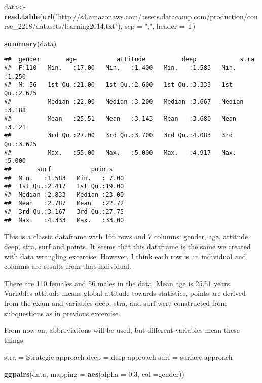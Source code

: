 \documentclass[
]{article}
\newenvironment{Shaded}{\begin{snugshade}}{\end{snugshade}}
\newcommand{\DataTypeTok}[1]{\textcolor[rgb]{0.13,0.29,0.53}{#1}}
\newcommand{\FloatTok}[1]{\textcolor[rgb]{0.00,0.00,0.81}{#1}}
\newcommand{\KeywordTok}[1]{\textcolor[rgb]{0.13,0.29,0.53}{\textbf{#1}}}
\newcommand{\NormalTok}[1]{#1}
\newcommand{\StringTok}[1]{\textcolor[rgb]{0.31,0.60,0.02}{#1}}
\begin{document}
\begin{Shaded}
\begin{Highlighting}[]
\NormalTok{data<-}\StringTok{ }\KeywordTok{read.table}\NormalTok{(}\KeywordTok{url}\NormalTok{(}\StringTok{"http://s3.amazonaws.com/assets.datacamp.com/production/course_2218/datasets/learning2014.txt"}\NormalTok{), }
                  \DataTypeTok{sep =} \StringTok{","}\NormalTok{, }\DataTypeTok{header =}\NormalTok{ T)}

\KeywordTok{summary}\NormalTok{(data)}
\end{Highlighting}
\end{Shaded}

\begin{verbatim}
##  gender       age           attitude          deep            stra      
##  F:110   Min.   :17.00   Min.   :1.400   Min.   :1.583   Min.   :1.250  
##  M: 56   1st Qu.:21.00   1st Qu.:2.600   1st Qu.:3.333   1st Qu.:2.625  
##          Median :22.00   Median :3.200   Median :3.667   Median :3.188  
##          Mean   :25.51   Mean   :3.143   Mean   :3.680   Mean   :3.121  
##          3rd Qu.:27.00   3rd Qu.:3.700   3rd Qu.:4.083   3rd Qu.:3.625  
##          Max.   :55.00   Max.   :5.000   Max.   :4.917   Max.   :5.000  
##       surf           points     
##  Min.   :1.583   Min.   : 7.00  
##  1st Qu.:2.417   1st Qu.:19.00  
##  Median :2.833   Median :23.00  
##  Mean   :2.787   Mean   :22.72  
##  3rd Qu.:3.167   3rd Qu.:27.75  
##  Max.   :4.333   Max.   :33.00
\end{verbatim}

This is a classic dataframe with 166 rows and 7 columns: gender, age,
attitude, deep, stra, surf and points. It seems that this dataframe is
the same we created with data wrangling excercise. However, I think each
row is an individual and columns are results from that individual.

There are 110 females and 56 males in the data. Mean age is 25.51 years.
Variables attitude means global attitude towards statistics, points are
derived from the exam and variables deep, stra, and surf were
constructed from subquestions as in previous excercise.

From now on, abbreviations will be used, but different variables mean
these things:

stra = Strategic approach deep = deep approach surf = surface approach

\begin{Shaded}
\begin{Highlighting}[]
\KeywordTok{ggpairs}\NormalTok{(data, }\DataTypeTok{mapping =} \KeywordTok{aes}\NormalTok{(}\DataTypeTok{alpha =} \FloatTok{0.3}\NormalTok{, }\DataTypeTok{col =}\NormalTok{gender))}
\end{Highlighting}
\end{Shaded}
\end{document}
